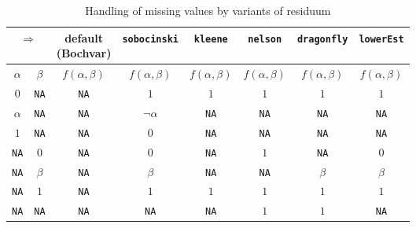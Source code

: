 \documentclass[review]{elsarticle}
\newcommand{\code}[1]{\texttt{#1}}
\begin{document}
\begin{table}
    \centering
    \caption{Handling of missing values by variants of residuum}
    \label{tab:implications}
    \begin{tabular}{cc|cccccc}
        \multicolumn{2}{c|}{$\Rightarrow$} & \makecell{default \\ (Bochvar)} & \texttt{sobocinski} & \texttt{kleene} & \texttt{nelson} & \texttt{dragonfly} & \texttt{lowerEst} \\
        \hline
        $\alpha$    & $\beta$     & $f(\alpha, \beta)$ & $f(\alpha, \beta)$ & $f(\alpha, \beta)$ & $f(\alpha, \beta)$ & $f(\alpha, \beta)$ & $f(\alpha, \beta)$ \\
        $0$         & \code{NA} & \code{NA} & $1$           & $1$         & $1$         & $1$         & $1$         \\
        $\alpha$    & \code{NA} & \code{NA} & $\lnot\alpha$ & \code{NA} & \code{NA} & \code{NA} & \code{NA} \\
        $1$         & \code{NA} & \code{NA} & $0$           & \code{NA} & \code{NA} & \code{NA} & \code{NA} \\
        \code{NA} & $0$         & \code{NA} & $0$           & \code{NA} & $1$         & \code{NA} & $0$         \\
        \code{NA} & $\beta$     & \code{NA} & $\beta$       & \code{NA} & \code{NA} & $\beta$     & $\beta$     \\
        \code{NA} & $1$         & \code{NA} & $1$           & $1$         & $1$         & $1$         & $1$         \\
        \code{NA} & \code{NA} & \code{NA} & \code{NA}   & \code{NA} & $1$         & $1$         & \code{NA} 
    \end{tabular}
\end{table}
\end{document}
